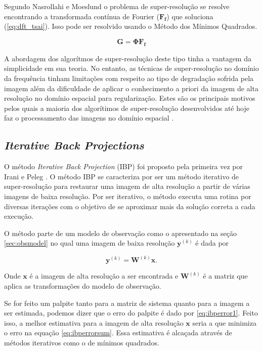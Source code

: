 Segundo Nasrollahi e Moeslund \cite{nasrollahi2014super} o problema de super-resolução se resolve encontrando a transformada contínua de Fourier ($\mathbf{F_f}$) que soluciona (\ref{eq:dft_tsai}).
Isso pode ser resolvido usando o Método dos Mínimos Quadrados.

\begin{equation}
	\label{eq:dft_tsai}
	\mathbf{G} = \mathbf{\Phi F_f}
\end{equation}

A abordagem dos algorítmos de super-resolução deste tipo tinha a vantagem da simplicidade em sua teoria.
No entanto, as técnicas de super-resolução no domínio da frequência tinham limitações com respeito ao tipo de degradação sofrida pela imagem além da dificuldade de aplicar o conhecimento a priori da imagem de alta resolução no domínio espacial para regularização.
Estes são os principais motivos pelos quais a maioria dos algorítimos de super-resolução desenvolvidos até hoje faz o processamento das imagens no domínio espacial \cite{park2003super}.

\subsection{\emph{Iterative Back Projections}}
O método \emph{Iterative Back Projection} (IBP) foi proposto pela primeira vez por Irani e Peleg \cite{irani1991improv}.
O método IBP se caracteriza por ser um método iterativo de super-resolução para restaurar uma imagem de alta resolução a partir de várias imagens de baixa resolução.
Por ser iterativo, o método executa uma rotina por diversas iterações com o objetivo de se aproximar mais da solução correta a cada execução.

O método parte de um modelo de observação como o apresentado na seção \ref{sec:obsmodel} no qual uma imagem de baixa resolução $\mathbf{y}^{(k)}$ é dada por

\begin{equation}
	\mathbf{y}^{(k)} = \mathbf{W}^{(k)} \mathbf{x}.
\end{equation}

Onde $\mathbf{x}$ é a imagem de alta resolução a ser encontrada e $\mathbf{W}^{(k)}$ é a matriz que aplica as transformações do modelo de observação.

Se for feito um palpite tanto para a matriz de sistema quanto para a imagem a ser estimada, podemos dizer que o erro do palpite é dado por \ref{eq:ibperror1}.
Feito isso, a melhor estimativa para a imagem de alta resolução $\mathbf{x}$ seria a que minimiza o erro na equação \ref{eq:ibperrorsum}.
Essa estimativa é alcaçada através de métodos iterativos como o de mínimos quadrados.

